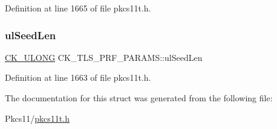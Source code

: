Definition at line 1665 of file pkcs11t.\+h.

\mbox{\label{struct_c_k___t_l_s___p_r_f___p_a_r_a_m_s_aae15be52f15063f44a1aaa60dd342171}} 
\subsubsection{\texorpdfstring{ul\+Seed\+Len}{ulSeedLen}}
{\footnotesize\ttfamily \hyperlink{pkcs11t_8h_a35181858a3b7a0a81f49d180d8f446ef}{C\+K\+\_\+\+U\+L\+O\+NG} C\+K\+\_\+\+T\+L\+S\+\_\+\+P\+R\+F\+\_\+\+P\+A\+R\+A\+M\+S\+::ul\+Seed\+Len}



Definition at line 1663 of file pkcs11t.\+h.



The documentation for this struct was generated from the following file\+:\begin{DoxyCompactItemize}
\item 
Pkcs11/\hyperlink{pkcs11t_8h}{pkcs11t.\+h}\end{DoxyCompactItemize}
